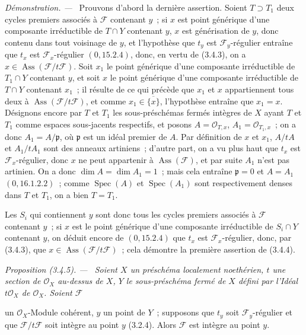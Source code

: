 \documentclass[10pt,oneside]{book}
\newcommand{\oldpage}[2][]{%
  \setcounter{footnote}{0}%
  \marginpar{\scriptsize\textbf{#1}~|~#2}\ignorespaces}
\newenvironment{proposition}[1][]{%
  \par\medskip\noindent\itshape Proposition (#1). ---\ }{\par}
\newenvironment{proof}{%
  \par\medskip\noindent\textit{Démonstration. ---\ }}{\par}
\begin{document}
\begin{proof}
Prouvons d'abord la dernière assertion. Soient $T\supset T_1$ deux cycles
premiers associés à $\mathcal F$ contenant $y$~; si $x$ est point générique
d'une composante irréductible de $T\cap Y$ contenant $y$, $x$ est
générisation de $y$, donc contenu dans tout voisinage de $y$, et l'hypothèse
que $t_y$ est $\mathcal F_y$-régulier entraîne que $t_x$ est
$\mathcal F_x$-régulier $(0,15.2.4)$, donc, en vertu de (3.4.3), on a
$x\in\operatorname{Ass}(\mathcal F/t\mathcal F)$. Soit $x_1$ le point
générique d'une composante irréductible de $T_1\cap Y$ contenant $y$, et soit
$x$ le point générique d'une composante irréductible de $T\cap Y$ contenant
$x_1$~; il résulte de ce qui précède que $x_1$ et $x$ appartiennent tous deux
à $\operatorname{Ass}(\mathcal F/t\mathcal F)$, et comme
$x_1\in\overline{\{x\}}$, l'hypothèse entraîne que $x_1=x$. Désignons encore
par $T$ et $T_1$ les sous-préschémas fermés intègres de $X$ ayant $T$ et
$T_1$ comme espaces sous-jacents respectifs, et posons
$A=\mathcal O_{T,x}$, $A_1=\mathcal O_{T_1,x}$~; on a donc
$A_1=A/\mathfrak p$, où $\mathfrak p$ est un idéal premier de $A$. Par
définition de $x$ et $x_1$, $A/tA$ et $A_1/tA_1$ sont des anneaux artiniens~;
d'autre part, on a vu plus haut que $t_x$ est $\mathcal F_x$-régulier, donc
$x$ ne peut appartenir à $\operatorname{Ass}(\mathcal F)$, et par suite $A_1$
n'est pas artinien. On a donc $\dim A=\dim A_1=1$~; mais cela entraîne
$\mathfrak p=0$ et $A=A_1$ $(0,16.1.2.2)$~; comme
$\operatorname{Spec}(A)$ et $\operatorname{Spec}(A_1)$ sont respectivement
denses dans $T$ et $T_1$, on a bien $T=T_1$.

Les $S_i$ qui contiennent $y$ sont donc tous les cycles premiers associés à
$\mathcal F$ contenant $y$~; si $x$ est le point générique d'une composante
irréductible de $S_i\cap Y$ contenant $y$, on déduit encore de $(0,15.2.4)$
que $t_x$ est $\mathcal F_x$-régulier, donc, par (3.4.3), que
$x\in\operatorname{Ass}(\mathcal F/t\mathcal F)$~; cela démontre la première
assertion de (3.4.4).
\end{proof}

\begin{proposition}[3.4.5]
\label{IV.2.3.4.5-fr}
Soient $X$ un préschéma localement noethérien, $t$ une section de
$\mathcal O_X$ au-dessus de $X$, $Y$ le sous-préschéma fermé de $X$ défini par
l'Idéal $t\mathcal O_X$ de $\mathcal O_X$. Soient $\mathcal F$

\oldpage[IV-2]{50}

un $\mathcal O_X$-Module cohérent, $y$ un point de $Y$~; supposons que $t_y$
soit $\mathcal F_y$-régulier et que $\mathcal F/t\mathcal F$ soit intègre au
point $y$ (3.2.4). Alors $\mathcal F$ est intègre au point $y$.
\end{proposition}
\end{document}
